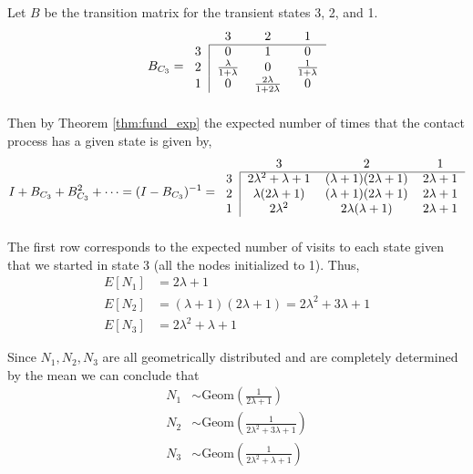 \documentclass{article}
\theoremstyle{plain}
\theoremstyle{definition}
\theoremstyle{remark}
\numberwithin{equation}{section}
\begin{document}
Let $B$ be the transition matrix for the transient states 3, 2, and 1.
$$
B_{C_3} = \begin{blockarray}{cccc}
    & 3 & 2 & 1\\
    \begin{block}{c|ccc}
    \cline{2-4}
        3 & 0 & 1 & 0\\
        2 & \frac{\lambda}{1 + \lambda} & 0 &
        \frac{1}{1 + \lambda}\\
        1 & 0 & \frac{2\lambda}{1 + 2 \lambda} & 0\\
    \end{block}
    \end{blockarray}
$$
Then by Theorem \ref{thm:fund_exp} the expected number of times that the contact process has a given state is given by,
$$
    I + B_{C_3} + B_{C_3}^2 + \cdots = (I - B_{C_3})^{-1} = \begin{blockarray}{cccc}
    & 3 & 2 & 1\\
    \begin{block}{c|ccc}
    \cline{2-4}
    3 & 2 \lambda^2 + \lambda + 1 & (\lambda + 1) (2 \lambda + 1) &  2 \lambda + 1\\
    2 & \lambda (2 \lambda + 1) & (\lambda + 1)(2 \lambda + 1) & 2 \lambda + 1\\
    1 & 2 \lambda^2 & 2 \lambda ( \lambda + 1) &  2\lambda + 1\\
    \end{block}
    \end{blockarray}
$$
The first row corresponds to the expected number of visits to each state given that we started in state 3 (all the nodes initialized to 1).
Thus,
\begin{align*}
    E[N_1] &= 2 \lambda + 1\\
    E[N_2] &= (\lambda + 1) (2 \lambda + 1) = 2\lambda^2 + 3 \lambda + 1\\
    E[N_3] &=  2 \lambda^2 + \lambda + 1
\end{align*}

Since $N_1, N_2, N_3$ are all geometrically distributed and are completely determined by the mean we can conclude that
\begin{align*}
    N_1 &\sim  \text{Geom}\left(\frac{1}{2 \lambda + 1} \right)\\
    N_2 &\sim \text{Geom}\left(\frac{1}{2\lambda^2 + 3 \lambda + 1} \right)\\
    N_3 &\sim  \text{Geom}\left(\frac{1}{2 \lambda^2 + \lambda + 1}\right)
\end{align*}
\end{document}
